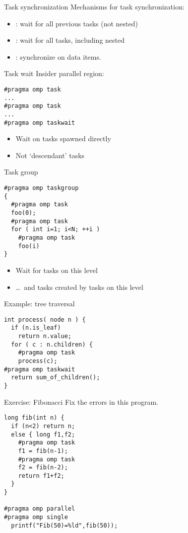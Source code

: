 \begin{numberedframe}{Task synchronization}
  Mechanisms for task synchronization:
  \begin{itemize}
  \item {}: wait for all previous tasks (not nested)
  \item {}: wait for all tasks, including nested
  \item {}: synchronize on data items.
  \end{itemize}
\end{numberedframe}

\begin{numberedframe}{Task wait}
Insider parallel region:
\begin{lstlisting}
#pragma omp task
...
#pragma omp task
...
#pragma omp taskwait
\end{lstlisting}
  \begin{itemize}
  \item Wait on tasks spawned directly
  \item Not `descendant' tasks
  \end{itemize}
\end{numberedframe}

\begin{numberedframe}{Task group}
\begin{lstlisting}
#pragma omp taskgroup
{
  #pragma omp task
  foo(0);
  #pragma omp task
  for ( int i=1; i<N; ++i )
    #pragma omp task
    foo(i)
}
\end{lstlisting}
  \begin{itemize}
  \item Wait for tasks on this level
  \item \ldots~and tasks created by tasks on this level
  \end{itemize}
\end{numberedframe}

\begin{numberedframe}{Example: tree traversal}
\begin{lstlisting}
int process( node n ) {
  if (n.is_leaf)
    return n.value;
  for ( c : n.children) {
    #pragma omp task
    process(c);
#pragma omp taskwait
  return sum_of_children();
}
\end{lstlisting}
\end{numberedframe}

\begin{numberedframe}{Exercise: Fibonacci}
  Fix the errors in this program.
\begin{lstlisting}
long fib(int n) {
  if (n<2) return n;
  else { long f1,f2;
    #pragma omp task
    f1 = fib(n-1);
    #pragma omp task
    f2 = fib(n-2);
    return f1+f2;
  }
}

#pragma omp parallel
#pragma omp single
  printf("Fib(50)=%ld",fib(50));
\end{lstlisting}
\end{numberedframe}

